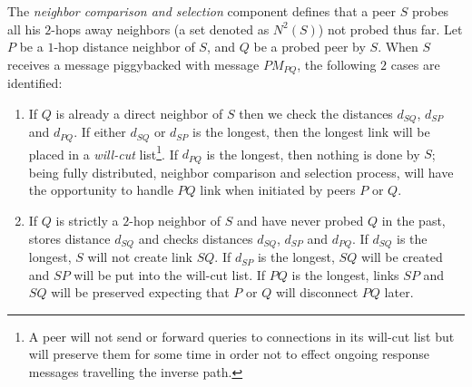 The \emph{neighbor comparison and selection} component defines that a peer $S$
probes all his $2$-hops away neighbors (a set denoted as $ N^2(S)$) not probed
thus far. Let $P$ be a $1$-hop distance neighbor of $S$, and $Q$ be a probed
peer by $S$. When $S$ receives a message piggybacked with message $PM_{PQ}$, 
the following $2$ cases are identified:

\begin{enumerate}
  \item If $Q$ is already a direct neighbor of $S$ then we check 
	the distances $d_{SQ}$, $d_{SP}$ and $d_{PQ}$. 
	If either $d_{SQ}$ or $d_{SP}$ is the longest, then the longest
  	link will be placed in a \emph{will-cut} list\footnote{A peer will not send or
  	forward queries to connections in its will-cut list but will preserve them
  	for some time in order not to effect ongoing response messages travelling the
  	inverse path.}. 
	If $d_{PQ}$ is the longest, then nothing is done by $S$; being
  	fully distributed, neighbor comparison and selection process, will have the
  	opportunity to handle $PQ$ link when initiated by peers $P$ or $Q$.

  \item If $Q$ is strictly a $2$-hop neighbor of $S$ and have never probed $Q$
  	in the past, stores distance $d_{SQ}$ and checks 
	distances $d_{SQ}$, $d_{SP}$ and $d_{PQ}$.
  	If $d_{SQ}$ is the longest, $S$ will not create link $SQ$. If $d_{SP}$ is the
  	longest, $SQ$ will be created and $SP$ will be put into the will-cut list.
  	If $PQ$ is the longest, links $SP$ and $SQ$ will be preserved expecting that
  	$P$ or $Q$ will disconnect $PQ$ later.
\end{enumerate}

